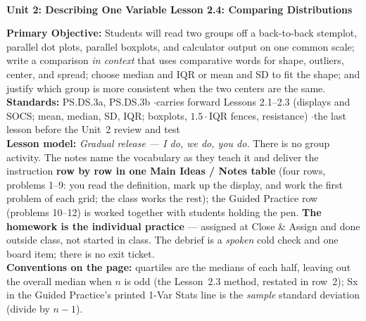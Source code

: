\documentclass[10pt]{article}
\newcommand{\UnitNumberName}{Unit 2: Describing One Variable \quad}
\newcommand{\LessonNumberName}{Lesson 2.4: Comparing Distributions}
\begin{document}
\begin{center}
    {\Large\bfseries \CourseName \\
    {\small\bfseries \UnitNumberName \LessonNumberName}}
\end{center}

\begin{tcolorbox}[colback=frost, colframe=cerulean, boxrule=0.9pt, arc=2mm,
    left=2mm, right=2mm, top=1.5mm, bottom=1.5mm]
    \textbf{Primary Objective:} Students will read two groups off a back-to-back stemplot,
    parallel dot plots, parallel boxplots, and calculator output on one common scale; write a
    comparison \emph{in context} that uses comparative words for shape, outliers, center, and
    spread; choose median and IQR or mean and SD to fit the shape; and justify which group is
    more consistent when the two centers are the same.
    \\[2pt]
    \textbf{Standards:} PS.DS.3a, PS.DS.3b \quad$\cdot$\quad carries forward Lessons 2.1--2.3
    (displays and SOCS; mean, median, SD, IQR; boxplots, $1.5\cdot$IQR fences, resistance)
    \quad$\cdot$\quad the last lesson before the Unit~2 review and test
    \\[2pt]
    \textbf{Lesson model:} \emph{Gradual release --- I do, we do, you do.} There is no group
    activity. The notes name the vocabulary as they teach it and deliver the instruction
    \textbf{row by row in one Main Ideas / Notes table} (four rows, problems 1--9: you read
    the definition, mark up the display, and work the first problem of each grid; the class
    works the rest); the Guided Practice row (problems 10--12) is worked together with students
    holding the pen. \textbf{The homework is the individual practice} --- assigned at Close \&
    Assign and done outside class, not started in class. The debrief is a \emph{spoken} cold
    check and one board item; there is no exit ticket.
    \\[2pt]
    \textbf{Conventions on the page:} quartiles are the medians of each half, leaving out the
    overall median when $n$ is odd (the Lesson~2.3 method, restated in row~2); Sx in the
    Guided Practice's printed 1-Var Stats line is the \emph{sample} standard deviation
    (divide by $n-1$).
\end{tcolorbox}
\end{document}
